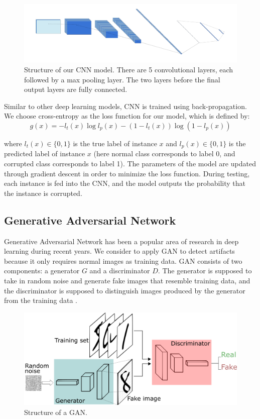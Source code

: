 \begin{figure}[h]
\captionsetup{}
\includegraphics[scale=0.5]{images/cnn_structure.png}
\caption[Structure of our CNN model]{Structure of our CNN model. There are 5 convolutional layers, each followed by a max pooling layer. The two layers before the final output layers are fully connected.}
\label{fig:cnnstructure}
\end{figure}


\noindent Similar to other deep learning models, CNN is trained using back-propagation. We choose cross-entropy \cite{loss_function} as the loss function for our model, which is defined by:
$$ g(x) = - l_t (x) \log l_p (x) - (1-l_t (x)) \log (1 - l_p(x))$$

\noindent where $l_t(x) \in \{0,1\}$ is the true label of instance $x$ and $l_p(x) \in \{0,1\}$ is the predicted label of instance $x$ (here normal class corresponds to label 0, and corrupted class corresponds to label 1). The parameters of the model are updated through gradient descent in order to minimize the loss function. During testing, each instance is fed into the CNN, and the model outputs the probability that the instance is corrupted.\\

\subsection{Generative Adversarial Network}

\noindent Generative Adversarial Network has been a popular area of research in deep learning during recent years. We consider to apply GAN to detect artifacts because it only requires normal images as training data. GAN consists of two components: a generator $G$ and a discriminator $D$. The generator is supposed to take in random noise and generate fake images that resemble training data, and the discriminator is supposed to distinguish images produced by the generator from the training data \cite{gan}. \\


\begin{figure}[h]
\centering
\includegraphics[scale=0.3]{images/gan.png}
\caption{Structure of a GAN.}
\label{fig:structureGAN}
\end{figure}

